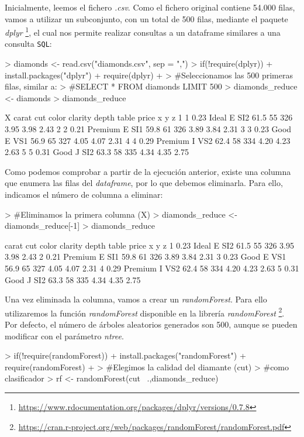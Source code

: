 \documentclass [a4paper] {article}
\begin{document}
Inicialmente, leemos el fichero \textit{.csv}. Como el fichero original contiene 54.000 filas, vamos a utilizar un subconjunto, con un total de 500 filas, mediante el paquete \textit{dplyr} \footnote{\url{https://www.rdocumentation.org/packages/dplyr/versions/0.7.8}}, el cual nos permite realizar consultas a un dataframe similares a una consulta \texttt{SQL}:
\begin{Schunk}
\begin{Sinput}
> diamonds <- read.csv("diamonds.csv", sep = ",")
> if(!require(dplyr)){
+   install.packages("dplyr")
+   require(dplyr)
+ }
> #Seleccionamos las 500 primeras filas, similar a:
> #SELECT * FROM diamonds LIMIT 500
> diamonds_reduce <- diamonds %>% head(500)
> diamonds_reduce %>% head(5)
\end{Sinput}
\begin{Soutput}
  X carat     cut color clarity depth table price    x    y    z
1 1  0.23   Ideal     E     SI2  61.5    55   326 3.95 3.98 2.43
2 2  0.21 Premium     E     SI1  59.8    61   326 3.89 3.84 2.31
3 3  0.23    Good     E     VS1  56.9    65   327 4.05 4.07 2.31
4 4  0.29 Premium     I     VS2  62.4    58   334 4.20 4.23 2.63
5 5  0.31    Good     J     SI2  63.3    58   335 4.34 4.35 2.75
\end{Soutput}
\end{Schunk}
\newpage
Como podemos comprobar a partir de la ejecución anterior, existe una columna que enumera las filas del \textit{dataframe}, por lo que debemos eliminarla. Para ello, indicamos el número de columna a eliminar:
\begin{Schunk}
\begin{Sinput}
> #Eliminamos la primera columna (X)
> diamonds_reduce <- diamonds_reduce[-1]
> diamonds_reduce %>% head(5)
\end{Sinput}
\begin{Soutput}
  carat     cut color clarity depth table price    x    y    z
1  0.23   Ideal     E     SI2  61.5    55   326 3.95 3.98 2.43
2  0.21 Premium     E     SI1  59.8    61   326 3.89 3.84 2.31
3  0.23    Good     E     VS1  56.9    65   327 4.05 4.07 2.31
4  0.29 Premium     I     VS2  62.4    58   334 4.20 4.23 2.63
5  0.31    Good     J     SI2  63.3    58   335 4.34 4.35 2.75
\end{Soutput}
\end{Schunk}

Una vez eliminada la columna, vamos a crear un \textit{randomForest}. Para ello utilizaremos la función \textit{randomForest} disponible en la librería \textit{randomForest} \footnote{\url{https://cran.r-project.org/web/packages/randomForest/randomForest.pdf}}. Por defecto, el número de árboles aleatorios generados son 500, aunque se pueden modificar con el parámetro \textit{ntree}.
\begin{Schunk}
\begin{Sinput}
> if(!require(randomForest)){
+   install.packages("randomForest")
+   require(randomForest)
+ }
> #Elegimos la calidad del diamante (cut)
> #como clasificador
> rf <- randomForest(cut ~.,diamonds_reduce)
\end{Sinput}
\end{Schunk}
\end{document}
